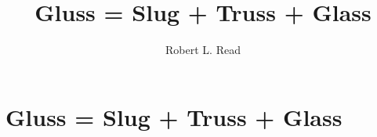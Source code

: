 \documentclass[12pt]{amsart}
\title{Gluss = Slug + Truss + Glass}
\author{Robert L. Read}
\date{} %
\begin{document}
\maketitle
\tableofcontents

\section{Gluss = Slug + Truss + Glass}
\subsection{}
\end{document}
